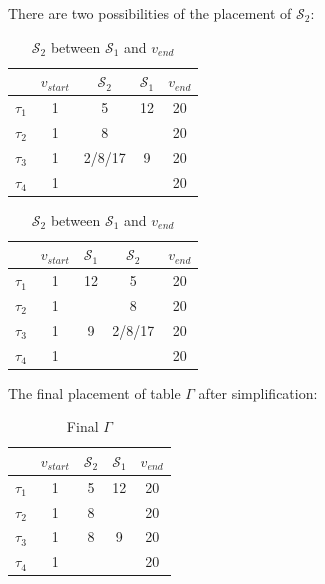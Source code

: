 There are two possibilities of the placement of $\mathcal{S}_{2}$: 
\begin{table}[H]
\begin{minipage}[c]{0.49\linewidth}
\centering
\caption{$\mathcal{S}_{2}$ between $v_{start}$ and $\mathcal{S}_{1}$}
\label{tab:tab_next1}
\begin{tabular}{ccccc}
\toprule

 & $v_{start}$ & $\mathcal{S}_{2}$ & $\mathcal{S}_{1}$ & $v_{end}$\\
\midrule
$\tau_{1}$ & 1 & 5 \cellcolor{green}& 12& 20\\
$\tau_{2}$ & 1 & 8 \cellcolor{green}& & 20\\
$\tau_{3}$ & 1 & 2/8/17 \cellcolor{green}& 9 & 20\\
$\tau_{4}$ & 1 & \cellcolor{red}& & 20\\
\bottomrule
\end{tabular}
\end{minipage}
\begin{minipage}[c]{0.49\linewidth}

\centering
\caption{$\mathcal{S}_{2}$ between $\mathcal{S}_{1}$ and $v_{end}$}
\label{tab:tab_next2}
\begin{tabular}{ccccc}
\toprule

 & $v_{start}$ & $\mathcal{S}_{1}$ & $\mathcal{S}_{2}$ & $v_{end}$\\
\midrule
$\tau_{1}$ & 1 & 12& 5 \cellcolor{red} &20\\
$\tau_{2}$ & 1 &  &  8 \cellcolor{green} &20\\
$\tau_{3}$ & 1 & 9 & 2/8/17 \cellcolor{green} &20\\
$\tau_{4}$ & 1 &   & \cellcolor{red} &20\\
\bottomrule
\end{tabular}
\end{minipage}
\end{table}

The final placement of table $\Gamma$ after simplification: 
\begin{table}[H]
\centering
\caption{Final $\Gamma$}
\label{tab:tab_final}
\begin{tabular}{ccccc}
\toprule
 & $v_{start}$ & $\mathcal{S}_{2}$ & $\mathcal{S}_{1}$ & $v_{end}$\\
\midrule
$\tau_{1}$ & 1 & 5 & 12& 20\\
$\tau_{2}$ & 1 & 8 &   & 20\\
$\tau_{3}$ & 1 & 8 & 9 & 20\\
$\tau_{4}$ & 1 &   &   & 20\\
\bottomrule
\end{tabular}
\end{table}

